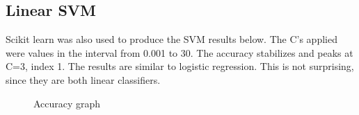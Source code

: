 \subsection{Linear SVM}
Scikit learn was also used to produce the SVM results below. The C's applied were values in the interval from 0.001 to 30. The accuracy stabilizes and peaks at C=3, index 1. The results are similar to logistic regression. This is not surprising, since they are both linear classifiers.  
\\
\par
\begin{figure}[H]
  \centering
  \hfill
  \hfill
   \caption{Accuracy graph}
\end{figure}
\newpage
